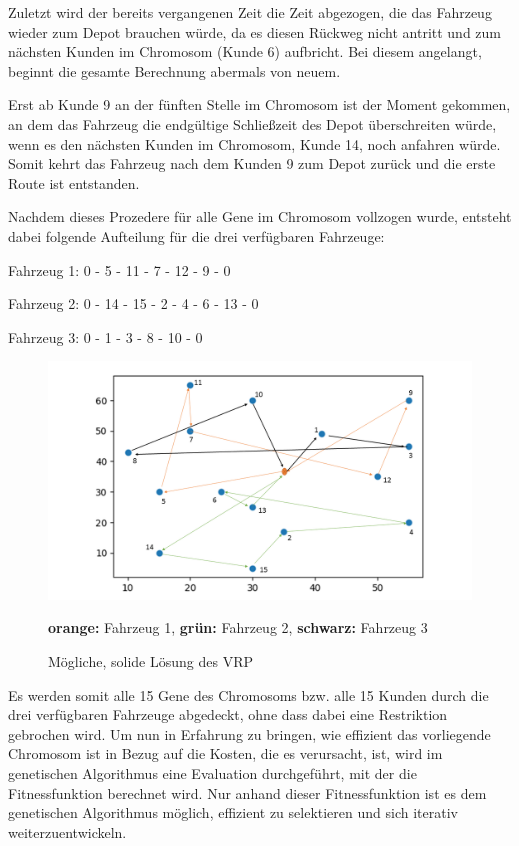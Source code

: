 \documentclass[a4paper,12pt,parskip,bibtotoc,liststotoc]{article}
\begin{document}
Zuletzt wird der bereits vergangenen Zeit die Zeit abgezogen, die das Fahrzeug wieder zum Depot brauchen würde, da es diesen Rückweg nicht antritt und zum nächsten Kunden im Chromosom (Kunde 6) aufbricht.
Bei diesem angelangt, beginnt die gesamte Berechnung abermals von neuem.

Erst ab Kunde 9 an der fünften Stelle im Chromosom ist der Moment gekommen, an dem das Fahrzeug die endgültige Schließzeit des Depot überschreiten würde, wenn es den nächsten Kunden im Chromosom, Kunde 14, noch anfahren würde.
Somit kehrt das Fahrzeug nach dem Kunden 9 zum Depot zurück und die erste Route ist entstanden. 

Nachdem dieses Prozedere für alle Gene im Chromosom vollzogen wurde, entsteht dabei folgende Aufteilung für die drei verfügbaren Fahrzeuge: 

\begin{center}

Fahrzeug 1: 0 - 5 - 11 - 7 - 12 - 9 - 0

Fahrzeug 2: 0 - 14 - 15 - 2 - 4 - 6 - 13 - 0

Fahrzeug 3: 0 - 1 - 3 - 8 - 10 - 0

\end{center}


\begin{figure}[h!]
  \begin{center}
    \includegraphics[width=150mm]{vrp.png}
    \caption{Mögliche, solide Lösung des VRP}  \label{Typen}
    {\footnotesize \textbf{orange:} Fahrzeug 1, \textbf{grün:} Fahrzeug 2, \textbf{schwarz:} Fahrzeug 3}
  \end{center}
\end{figure}

Es werden somit alle 15 Gene des Chromosoms bzw. alle 15 Kunden durch die drei verfügbaren Fahrzeuge abgedeckt, ohne dass dabei eine Restriktion gebrochen wird.
Um nun in Erfahrung zu bringen, wie effizient das vorliegende Chromosom ist in Bezug auf die Kosten, die es verursacht, ist, wird im genetischen Algorithmus eine Evaluation durchgeführt, mit der die Fitnessfunktion berechnet wird. 
Nur anhand dieser Fitnessfunktion ist es dem genetischen Algorithmus möglich, effizient zu selektieren und sich iterativ weiterzuentwickeln.
\end{document}
